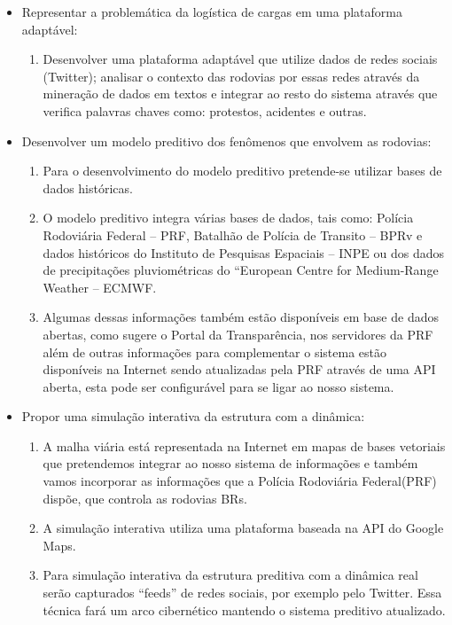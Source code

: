 \begin{itemize}
 \item Representar a problemática da logística de cargas em uma plataforma adaptável:
 
      \begin{enumerate}
       \item Desenvolver uma plataforma adaptável que utilize dados de redes sociais (Twitter); analisar o contexto das rodovias por essas 
       redes através da mineração de dados em textos e integrar ao resto do sistema através que verifica palavras chaves como: protestos, acidentes e outras.
      \end{enumerate}

 \item Desenvolver um modelo preditivo dos fenômenos que envolvem as rodovias:

      \begin{enumerate}
       \item Para o desenvolvimento do modelo preditivo pretende-se utilizar bases de dados históricas.
       \item O modelo preditivo integra várias bases de dados, tais como: Polícia Rodoviária Federal -- PRF, Batalhão de Polícia de Transito -- BPRv e dados históricos 
       do Instituto de Pesquisas Espaciais -- INPE ou dos dados de precipitações pluviométricas do ``European Centre for Medium-Range Weather -- ECMWF.
       \item Algumas dessas informações também estão disponíveis em base de dados abertas, como sugere o Portal da Transparência, nos servidores da PRF além de outras informações para complementar o sistema estão 
       disponíveis na Internet sendo atualizadas pela PRF através de uma API aberta, esta pode ser configurável para se ligar ao nosso sistema.
      \end{enumerate}

 \item Propor uma simulação interativa da estrutura com a dinâmica:
      
      \begin{enumerate}
       \item A malha viária está representada na Internet em mapas de bases vetoriais que pretendemos integrar ao nosso sistema de informações e também vamos incorporar 
       as informações que a Polícia Rodoviária Federal(PRF) dispõe, que controla as rodovias BRs. 
       \item A simulação interativa utiliza uma plataforma baseada na API do Google Maps.
       \item Para simulação interativa da estrutura preditiva com a dinâmica real serão capturados ``feeds'' de redes sociais, por exemplo pelo Twitter. Essa técnica 
       fará um arco cibernético mantendo o sistema preditivo atualizado.
      \end{enumerate}

\end{itemize}


